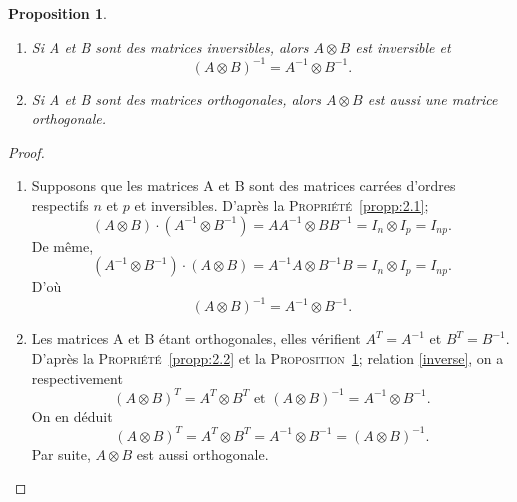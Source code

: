 \documentclass[11pt,a4paper,oneside]{book}
\newtheorem{prop}{Proposition}[chapter]
\newtheorem{proof}{Démonstration}
\newcommand{\propref}[1]{\textsc{Proposition}~\ref{#1}}
\newcommand{\proppref}[1]{\textsc{Propriété}~\ref{#1}}
\begin{document}
\begin{prop}
	\label{prop:2.1}
	\emph{\\}
	\begin{enumerate}
		\item[(1)] Si A et B sont des matrices inversibles, alors $ A\otimes B $ est inversible et \begin{equation}\label{inverse}
		(A\otimes B)^{-1}=A^{-1}\otimes B^{-1}.
		\end{equation}
		\item[(2)]
		Si A et B sont des matrices orthogonales, alors $ A\otimes B $ est aussi une matrice orthogonale. 
	\end{enumerate}
\end{prop}
\begin{proof}
	\emph{\\}
	\begin{enumerate}
		\item[(1)]Supposons que les matrices A et B sont des matrices carrées d'ordres respectifs $ n $ et $ p $ et inversibles. D'après la \proppref{propp:2.1};
		$$(A\otimes B)\cdot(A^{-1}\otimes B^{-1})=AA^{-1}\otimes BB^{-1}=I_{n}\otimes I_{p}=I_{np}.$$ De même, $$(A^{-1}\otimes B^{-1})\cdot(A\otimes B)=A^{-1}A\otimes B^{-1}B=I_{n}\otimes I_{p}=I_{np}.$$ D'où $$(A\otimes B)^{-1}=A^{-1}\otimes B^{-1}.$$
		\item[(2)]Les matrices A et B étant orthogonales, elles vérifient $ A^{T}=A^{-1} $ et $ B^{T}=B^{-1} $. D'après la \proppref{propp:2.2} et la \propref{prop:2.1}; relation \eqref{inverse}, on a respectivement $$(A\otimes B)^{T}=A^{T}\otimes B^{T}\text{ et } (A\otimes B)^{-1}=A^{-1}\otimes B^{-1}.$$ On en déduit $$(A\otimes B)^{T}=A^{T}\otimes B^{T}=A^{-1}\otimes B^{-1}=(A\otimes B)^{-1}. $$ Par suite, $ A\otimes B $ est aussi orthogonale.
	\end{enumerate}
	
\end{proof}
\end{document}
